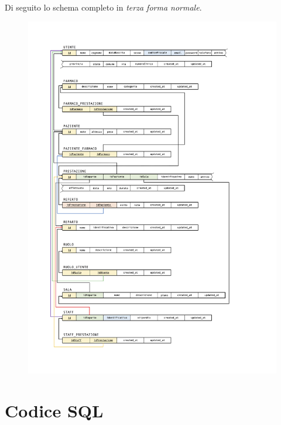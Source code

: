 \documentclass[paper=a4, fontsize=11pt,x11names]{report}
\begin{document}
Di seguito lo schema completo in \textit{terza forma normale}.
\begin{figure}
\begin{center}
\includegraphics[scale=0.90]{schema_relazionale}
\end{center}
\end{figure}
\restoregeometry



\chapter{Codice SQL}
\end{document}
